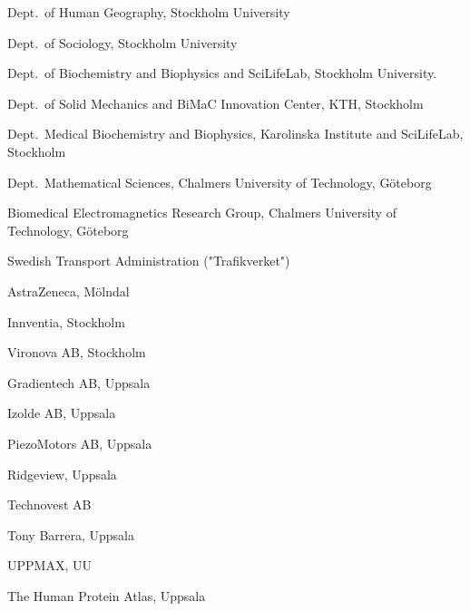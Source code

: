 {\begin{trivlist}
\item Dept.~of Human Geography, Stockholm University
\item Dept.~of Sociology, Stockholm University
\item Dept.~of Biochemistry and Biophysics and SciLifeLab, Stockholm University.
\item Dept.~of Solid Mechanics and BiMaC Innovation Center, KTH, Stockholm
\item Dept.~Medical Biochemistry and Biophysics, Karolinska Institute and SciLifeLab, Stockholm
\item Dept.~Mathematical Sciences, Chalmers University of Technology, G\"{o}teborg
\item Biomedical Electromagnetics Research Group, Chalmers University of Technology, G\"{o}teborg
\item Swedish Transport Administration ("Trafikverket")
\item  AstraZeneca, M\"{o}lndal
\item Innventia, Stockholm
\item Vironova AB, Stockholm
\item Gradientech AB, Uppsala
\item Izolde AB, Uppsala
\item PiezoMotors AB, Uppsala
\item Ridgeview, Uppsala
\item Technovest AB
\item Tony Barrera, Uppsala
\item UPPMAX, UU
\item The Human Protein Atlas, Uppsala
\end{trivlist}
}
\addtolength\textheight{-1ex}

\newpage

%
